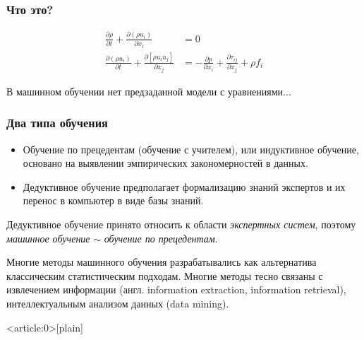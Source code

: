 \documentclass[fullscreen=true, bookmarks=true, hyperref={pdfencoding=unicode}]{beamer}
\begin{document}
\begin{frame}
  \frametitle{Что это?}
  \begin{align*}
  \frac{\partial \rho}{\partial t} + \frac{\partial(\rho u_{i})}{\partial x_{i}} &= 0 \\
  \frac{\partial (\rho u_{i})}{\partial t} + \frac{\partial[\rho u_{i}u_{j}]}{\partial x_{j}} &= -\frac{\partial p}{\partial x_{i}} + \frac{\partial \tau_{ij}}{\partial x_{j}} + \rho f_{i}
  \end{align*}

  \pause
  \vspace{1cm}
  В машинном обучении нет предзаданной модели с уравнениями...
\end{frame}


\begin{frame}
  \frametitle{Два типа обучения}
  \begin{itemize}
    \item Обучение по прецедентам (обучение с учителем), или индуктивное обучение, основано на выявлении эмпирических закономерностей в данных.
    \item Дедуктивное обучение предполагает формализацию знаний экспертов и их перенос в компьютер в виде базы знаний.
  \end{itemize}

  Дедуктивное обучение принято относить к области \textit{экспертных систем}, поэтому \textit{машинное обучение} $\sim$ \textit{обучение по прецедентам}.

  \vspace{0.5cm}
  Многие методы машинного обучения разрабатывались как альтернатива классическим статистическим подходам. Многие методы тесно связаны с извлечением информации (англ. information extraction, information retrieval), интеллектуальным анализом данных (data mining).
\end{frame}


{ %
    \begin{frame}<article:0>[plain]
     \end{frame}
}
\end{document}
